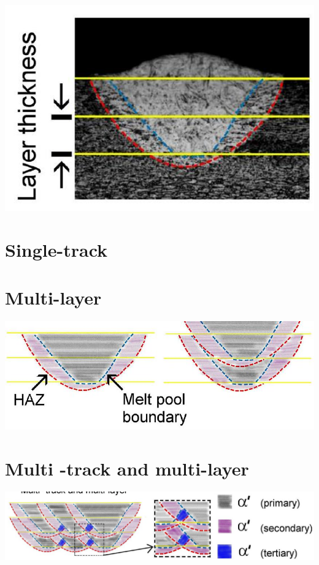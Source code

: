 \documentclass[10pt]{article}
\begin{document}
\begin{center}
\includegraphics[max width=\textwidth]{2024_02_28_5b6806184856c64a957ag-09}
\end{center}

\section*{Single-track}
\section*{Multi-layer}
\begin{center}
\includegraphics[max width=\textwidth]{2024_02_28_5b6806184856c64a957ag-09(1)}
\end{center}

\section*{Multi -track and multi-layer}
\begin{center}
\includegraphics[max width=\textwidth]{2024_02_28_5b6806184856c64a957ag-09(3)}
\end{center}
\end{document}
